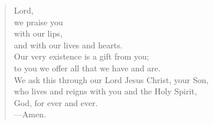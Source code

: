 \prayer

\setlength{\leftmargini}{\prayerleftmargini}

\begin{verse}
Lord,\\
we praise you\\
with our lips,\\
and with our lives and hearts.\\
Our very existence is a gift from you;\\
to you we offer all that we have and are.\\
We ask this through our Lord Jesus Christ, your Son,\\
who lives and reigns with you and the Holy Spirit,\\
God, for ever and ever.\\
{\color{red}---\thinspace}Amen.
\end{verse}

\setlength{\leftmargini}{\defleftmargini}